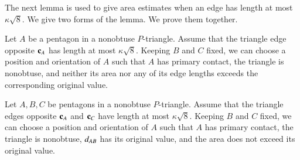 The next lemma is used to give area estimates when an edge has length
at most $\kappa\sqrt{8}$.  We give two forms of the lemma.  We prove
them together.

\begin{lemma} 
  Let $A$ be a pentagon in a nonobtuse $P$-triangle.  Assume that the
  triangle edge opposite ${\mathbf c}_A$ has length at most $\kappa\sqrt{8}$.
  Keeping $B$ and $C$ fixed, we can choose a position and orientation
of $A$ such that $A$ has primary contact, the triangle is nonobtuse,
and neither its area nor any of its edge lengths exceeds the
corresponding original value.
\end{lemma}

\begin{lemma} 
  Let $A,B,C$ be pentagons in a nonobtuse $P$-triangle.  Assume that
  the triangle edges opposite ${\mathbf c}_A$ and ${\mathbf c}_C$ have length at most
  $\kappa\sqrt{8}$.
  Keeping $B$ and $C$ fixed, we can choose a position and orientation
of $A$ such that $A$ has primary contact, the triangle is nonobtuse,
$d_{AB}$ has its original value, and the area does not exceed
its original value.
\end{lemma}

